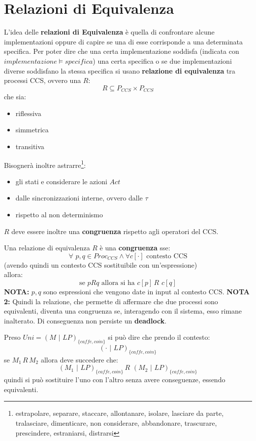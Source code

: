 \section{Relazioni di Equivalenza}
L'idea delle \textbf{relazioni di Equivalenza} è quella di confrontare alcune implementazioni oppure di capire se una di esse corrisponde a una determinata specifica. Per poter dire che una certa implementazione soddisfa (indicata con
$implementazione \vDash specifica$) una certa
specifica o se due implementazioni diverse soddisfano la stessa specifica si usano \textbf{relazione di equivalenza} tra processi CCS, ovvero una $R$:
\[R\subseteq P_{CCS}\times P_{CCS}\]
che sia:
\begin{itemize}
  \item riflessiva
  \item simmetrica
  \item transitiva
\end{itemize}
Bisognerà inoltre astrarre\footnote{estrapolare, separare, staccare, allontanare, isolare, lasciare da parte, tralasciare, dimenticare, non considerare, abbandonare, trascurare, prescindere, estraniarsi, distrarsi}:
\begin{itemize}
  \item gli stati e considerare le azioni $Act$
  \item dalle sincronizzazioni interne, ovvero dalle $\tau$
  \item rispetto al non determinismo
\end{itemize}
$R$ deve essere inoltre una \textbf{congruenza} rispetto agli operatori del CCS.\\
\begin{definizione}
  Una relazione di equivalenza $R$ è una \textbf{congruenza} sse:
  \[\forall \,\, p, q\in Proc_{CCS} \land \forall c[\cdot] \mbox{ contesto CCS}\]
  (avendo quindi un contesto CCS sostituibile con un'espressione)\\
  allora:
  \[\mbox{se }pRq\mbox{ allora si ha }c[p]\, R\,\, c[q]\]
\textbf{NOTA:} $p,q$ sono espressioni che vengono date in input al contesto CCS.
\textbf{NOTA 2:} Quindi la relazione, che permette di affermare che due processi sono equivalenti, diventa una congruenza se, interagendo con il sistema, esso rimane inalterato. Di conseguenza non persiste un \textbf{deadlock}.
\end{definizione} \vspace{5mm} %
\begin{esempio}
  Preso $Uni=(M\,\,|\,\, LP)_{\{caffe, coin\}}$ si può dire che prendo il contesto:
  \[(\cdot\,\,|\,\, LP)_{\{caffe, coin\}}\]
  se $M_1\, R\, M_2$ allora deve succedere che:
  \[(M_1\,\,|\,\, LP)_{\{caffe, coin\}}\, R\,\,(M_2\,\,|\,\, LP)_{\{caffe, coin\}}\]
  quindi si può sostituire l'uno con l'altro senza avere conseguenze, essendo
  equivalenti.
\end{esempio}
